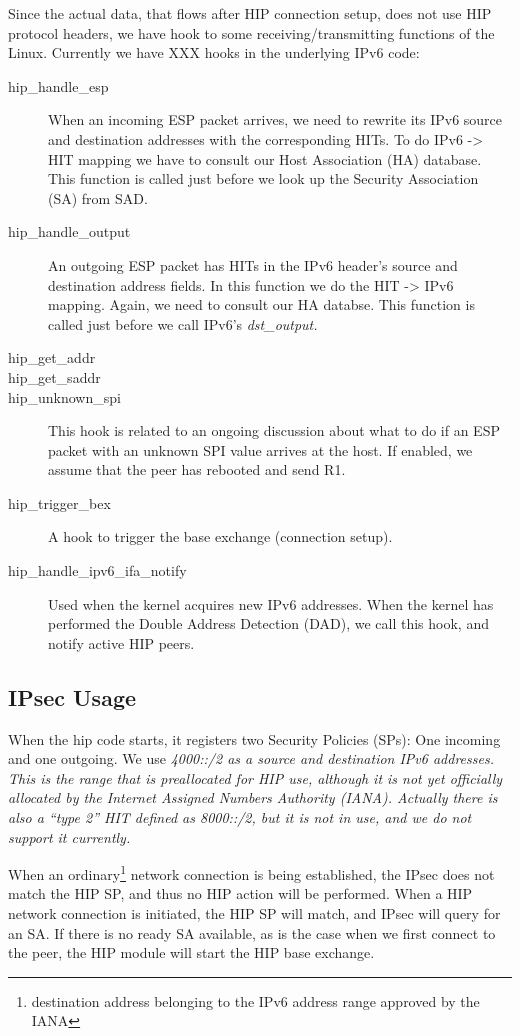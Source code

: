 Since the actual data, that flows after HIP connection setup, does not use HIP
protocol headers, we have hook to some receiving/transmitting functions of the
Linux. Currently we have XXX hooks in the underlying IPv6 code:

\begin{description}
\item[hip\_handle\_esp] When an incoming ESP packet arrives, we need to rewrite
  its IPv6 source and destination addresses with the corresponding HITs.  To do
  IPv6 -> HIT mapping we have to consult our Host Association (HA) database.
  This function is called just before we look up the Security Association (SA)
  from SAD.
\item[hip\_handle\_output] An outgoing ESP packet has HITs in the IPv6 header's
  source and destination address fields. In this function we do the HIT -> IPv6
  mapping.  Again, we need to consult our HA databse. This function is called
  just before we call IPv6's \em{dst\_output}.
\item[hip\_get\_addr]
\item[hip\_get\_saddr]
\item[hip\_unknown\_spi] This hook is related to an ongoing discussion about what
  to do if an ESP packet with an unknown SPI value arrives at the host.  If
  enabled, we assume that the peer has rebooted and send R1.
\item[hip\_trigger\_bex] A hook to trigger the base exchange (connection setup).
\item[hip\_handle\_ipv6\_ifa\_notify] Used when the kernel acquires new IPv6
  addresses.  When the kernel has performed the Double Address Detection (DAD),
  we call this hook, and notify active HIP peers.
\end{description}

\subsection{IPsec Usage}
When the hip code starts, it registers two Security Policies (SPs): One incoming
and one outgoing. We use \em{4000::/2} as a source and destination IPv6
addresses. This is the range that is preallocated for HIP use, although it is
not yet officially allocated by the Internet Assigned Numbers Authority (IANA).
Actually there is also a ``type 2'' HIT defined as \em{8000::/2}, but it is not
in use, and we do not support it currently.

When an ordinary\footnote{destination address belonging to the IPv6 address
  range approved by the IANA} network connection is being established, the IPsec
does not match the HIP SP, and thus no HIP action will be performed. When a HIP
network connection is initiated, the HIP SP will match, and IPsec will query for
an SA. If there is no ready SA available, as is the case when we first connect
to the peer, the HIP module will start the HIP base exchange.

